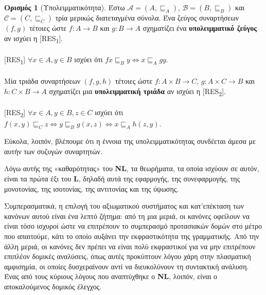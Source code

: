 \documentclass [a4paper,11pt] {book}
\theoremstyle{definition}
\theoremstyle{definition}
\newtheorem{definition}[theorem]{Ορισμός}
\newenvironment{remark}[1][Παρατήρηση]{\begin{trivlist}
\item[\hskip \labelsep {\bfseries #1}]}{\end{trivlist}}
\begin{document}
\begin{definition}[Υπολειμματικότητα]
\label{Residuation}
Έστω $\mathcal{A}=(A,\sqsubseteq_{A})$, $\mathcal{B}=(B,\sqsubseteq_{B})$ και $\mathcal{C}=(C,\sqsubseteq_{C})$ τρία μερικώς διατεταγμένα σύνολα. Ένα ζεύγος συναρτήσεων $(f,g)$ τέτοιες ώστε $f:A\to B$ και $g:B\to A$ σχηματίζει
ένα \textbf{υπολειμματικό ζεύγος} αν ισχύει η [RES\textsubscript{1}].
\paragraph{}
[RES\textsubscript{1}] $\forall x\in A, y\in B$ ισχύει ότι $fx \sqsubseteq_{B} y \Leftrightarrow x\sqsubseteq_{A} gy$.
\paragraph{}
Μία τριάδα συναρτήσεων $(f,g,h)$ τέτοιες ώστε $f: A\times B \to C$, $g:A\times C\to B$ και $h:C\times B\to A$ σχηματίζει μια \textbf{υπολειμματική τριάδα} αν ισχύει η [RES\textsubscript{2}].
\paragraph{}
[RES\textsubscript{2}] $\forall x\in A, y\in B, z\in C$ ισχύει ότι $f(x,y) \sqsubseteq_{C} z \Leftrightarrow y \sqsubseteq_{B} g(x,z) \Leftrightarrow x \sqsubseteq_{A} h(z,y)$. 
\end{definition}
\begin{remark}
Εύκολα, λοιπόν, βλέπουμε ότι η έννοια της υπολειμματικότητας συνδέεται άμεσα με αυτήν των συζυγών συναρτητών.
\end{remark}
Λόγω αυτής της «καθαρότητας» του \textbf{NL}, τα θεωρήματα, τα οποία ισχύουν σε αυτόν, είναι τα πρώτα έξι του \textbf{L}, δηλαδή αυτά της εφαρμογής, της συνεφαρμογής, της μονοτονίας, της ισοτονίας, της αντιτονίας και της ύψωσης.

Συμπερασματικά, η επιλογή του αξιωματικού συστήματος και κατ'επέκταση των κανόνων αυτού είναι ένα λεπτό ζήτημα: από τη μια μεριά, οι κανόνες οφείλουν να είναι τόσο ισχυροί ώστε να επιτρέπουν το συμπερασμό προτασιακών δομών στο μέτρο που απαιτούμε, κάτι το οποίο αυξάνει την εκφραστικότητα της γραμματικής. Από την άλλη μεριά, οι κανόνες δεν πρέπει να είναι πολύ εκφραστικοί για να μην επιτρέπουν επιπλέον δομικές αναλύσεις, όπως αυτές προκύπτουν λόγου χάρη στην πλασματική αμφισημία, οι οποίες δυσχεραίνουν αντί να διευκολύνουν τη συντακτική ανάλυση. Ένας από τους κύριους λόγους που αναπτύχθηκε ο \textbf{NL}, λοιπόν, είναι ο αποκαλούμενος δομικός έλεγχος.
\end{document}
